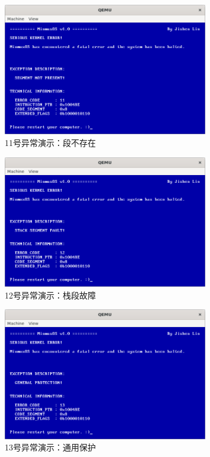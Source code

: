 \begin{figure}[htbp]
    \centering
    \includegraphics[width=0.8\textwidth]{figures/Exception11Presentation.png}
    \caption{11号异常演示：段不存在}
\end{figure}

\begin{figure}[htbp]
    \centering
    \includegraphics[width=0.8\textwidth]{figures/Exception12Presentation.png}
    \caption{12号异常演示：栈段故障}
\end{figure}

\begin{figure}[htbp]
    \centering
    \includegraphics[width=0.8\textwidth]{figures/Exception13Presentation.png}
    \caption{13号异常演示：通用保护}
\end{figure}

